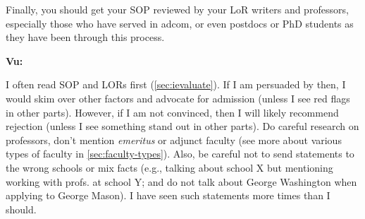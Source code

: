 \documentclass[oneside,11pt,dvipsnames]{book}
\newenvironment{commentbox}[1][]{
  \small
  \begin{mybox}
    {\small \textbf{#1}}
  }{
  \end{mybox}
}
\begin{document}
Finally, you should get your SOP reviewed by your LoR writers and professors, especially those who have served in adcom, or even postdocs or PhD students as they have been through this process.

\begin{commentbox}[Vu:]
  I often read SOP and LORs first (\autoref{sec:ievaluate}). If I am
  persuaded by then, I would skim over other factors and advocate for
  admission (unless I see red flags in other parts). However, if I am not
  convinced, then I will likely recommend rejection (unless I see
  something stand out in other parts).
  \tcblower
  Do careful research on professors, don't mention \emph{emeritus} or adjunct faculty (see more about various types of faculty in \autoref{sec:faculty-types}).
  Also, be careful not to send statements to the wrong schools or mix
  facts (e.g., talking about school X but mentioning working with
  profs. at school Y; and do not talk about George Washington when applying to George Mason). I have seen such statements more times than I should.
\end{commentbox}


\end{document}
